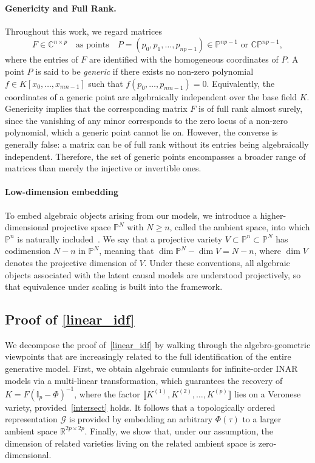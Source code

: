 \documentclass[10pt]{article}
\numberwithin{figure}{section}
\begin{document}
\paragraph{Genericity and Full Rank.} 
Throughout this work, we regard matrices 
\[
F \in \mathbb{C}^{n \times p} \quad \text{as points} \quad 
P = (p_0, p_1, \dots, p_{np-1}) \in \mathbb{P}^{np-1} \text{ or } \mathbb{CP}^{np-1},
\]
where the entries of \(F\) are identified with the homogeneous coordinates of \(P\). A point \(P\) is said to be \emph{generic} if there exists no non-zero polynomial $f \in K[x_0, \dots, x_{mn-1}]$ such that $f(p_0, \dots, p_{mn-1}) = 0$. Equivalently, the coordinates of a generic point are algebraically independent over the base field \(K\). Genericity implies that the corresponding matrix \(F\) is of full rank almost surely, since the vanishing of any minor corresponds to the zero locus of a non-zero polynomial, which a generic point cannot lie on. However, the converse is generally false: a matrix can be of full rank without its entries being algebraically independent. Therefore, the set of generic points encompasses a broader range of matrices than merely the injective or invertible ones.

\paragraph{Low-dimension embedding}
To embed algebraic objects arising from our models, we introduce a higher-dimensional projective space $\mathbb{P}^N$ with $N\ge n$, called the ambient space, into which $\mathbb{P}^n$ is naturally included~\citep[see][Ch.~I]{Hartshorne1977}. We say that a projective variety $V \subset \mathbb{P}^n \subset \mathbb{P}^N$ has codimension $N-n$ in $\mathbb{P}^N$, meaning that $\dim \mathbb{P}^N - \dim V = N-n$, where $\dim V$ denotes the projective dimension of $V$. Under these conventions, all algebraic objects associated with the latent causal models are understood projectively, so that equivalence under scaling is built into the framework.
\subsection{Proof of \autoref{linear_idf}}\label{proof_linear_idf}

We decompose the proof of~\autoref{linear_idf} by walking through the algebro-geometric viewpoints that are increasingly related to the full identification of the entire generative model. First, we obtain algebraic cumulants for infinite-order INAR models via a multi-linear transformation, which guarantees the recovery of $K=F(\mathbb{I}_{p}-\Phi)^{-1}$, where the factor $\llbracket K^{(1)}, K^{(2)}, \dots, K^{(p)} \rrbracket$ lies on a Veronese variety, provided~\autoref{intersect} holds.  It follows that a topologically ordered representation $\mathscr{G}$ is provided by embedding an arbitrary $\Phi(\tau)$ to a larger ambient space $\mathbb{R}^{2p\times 2p}$. Finally, we show that, under our assumption, the dimension of related varieties living on the related ambient space is zero-dimensional.
\end{document}
